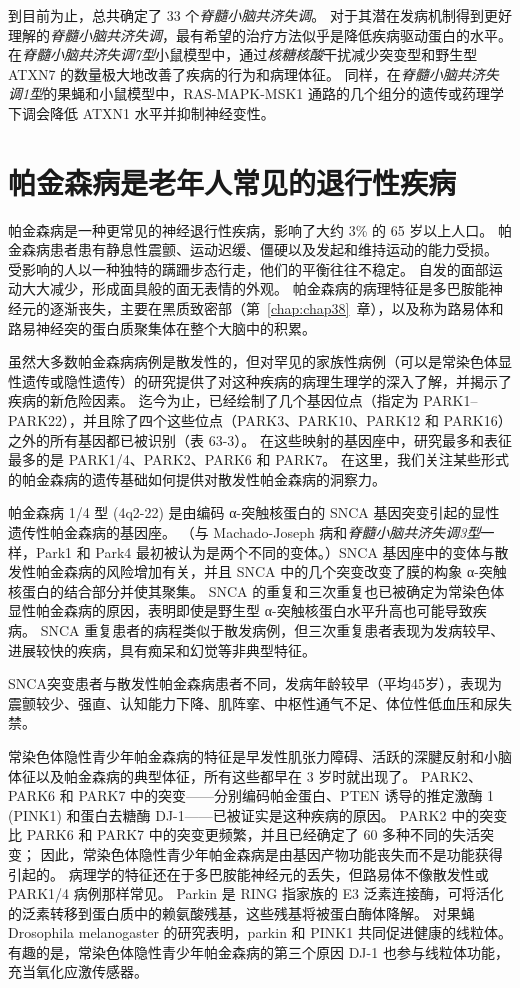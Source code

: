 到目前为止，总共确定了 33 个\textit{脊髓小脑共济失调}。
对于其潜在发病机制得到更好理解的\textit{脊髓小脑共济失调}，最有希望的治疗方法似乎是降低疾病驱动蛋白的水平。
在\textit{脊髓小脑共济失调7型}小鼠模型中，通过\textit{核糖核酸}干扰减少突变型和野生型 ATXN7 的数量极大地改善了疾病的行为和病理体征。
同样，在\textit{脊髓小脑共济失调1型}的果蝇和小鼠模型中，RAS-MAPK-MSK1 通路的几个组分的遗传或药理学下调会降低 ATXN1 水平并抑制神经变性。



\section{帕金森病是老年人常见的退行性疾病}

帕金森病是一种更常见的神经退行性疾病，影响了大约 3\% 的 65 岁以上人口。
帕金森病患者患有静息性震颤、运动迟缓、僵硬以及发起和维持运动的能力受损。
受影响的人以一种独特的蹒跚步态行走，他们的平衡往往不稳定。
自发的面部运动大大减少，形成面具般的面无表情的外观。
帕金森病的病理特征是多巴胺能神经元的逐渐丧失，主要在黑质致密部（第~\ref{chap:chap38}~章），以及称为路易体和路易神经突的蛋白质聚集体在整个大脑中的积累。


虽然大多数帕金森病病例是散发性的，但对罕见的家族性病例（可以是常染色体显性遗传或隐性遗传）的研究提供了对这种疾病的病理生理学的深入了解，并揭示了疾病的新危险因素。
迄今为止，已经绘制了几个基因位点（指定为 PARK1–PARK22），并且除了四个这些位点（PARK3、PARK10、PARK12 和 PARK16）之外的所有基因都已被识别（表 63-3）。
在这些映射的基因座中，研究最多和表征最多的是 PARK1/4、PARK2、PARK6 和 PARK7。
在这里，我们关注某些形式的帕金森病的遗传基础如何提供对散发性帕金森病的洞察力。


帕金森病 1/4 型 (4q2-22) 是由编码 α-突触核蛋白的 SNCA 基因突变引起的显性遗传性帕金森病的基因座。
（与 Machado-Joseph 病和\textit{脊髓小脑共济失调3型}一样，Park1 和 Park4 最初被认为是两个不同的变体。）SNCA 基因座中的变体与散发性帕金森病的风险增加有关，并且 SNCA 中的几个突变改变了膜的构象 α-突触核蛋白的结合部分并使其聚集。
SNCA 的重复和三次重复也已被确定为常染色体显性帕金森病的原因，表明即使是野生型 α-突触核蛋白水平升高也可能导致疾病。
SNCA 重复患者的病程类似于散发病例，但三次重复患者表现为发病较早、进展较快的疾病，具有痴呆和幻觉等非典型特征。


SNCA突变患者与散发性帕金森病患者不同，发病年龄较早（平均45岁），表现为震颤较少、强直、认知能力下降、肌阵挛、中枢性通气不足、体位性低血压和尿失禁。


常染色体隐性青少年帕金森病的特征是早发性肌张力障碍、活跃的深腱反射和小脑体征以及帕金森病的典型体征，所有这些都早在 3 岁时就出现了。
PARK2、PARK6 和 PARK7 中的突变——分别编码帕金蛋白、PTEN 诱导的推定激酶 1 (PINK1) 和蛋白去糖酶 DJ-1——已被证实是这种疾病的原因。
PARK2 中的突变比 PARK6 和 PARK7 中的突变更频繁，并且已经确定了 60 多种不同的失活突变；
因此，常染色体隐性青少年帕金森病是由基因产物功能丧失而不是功能获得引起的。
病理学的特征还在于多巴胺能神经元的丢失，但路易体不像散发性或 PARK1/4 病例那样常见。
Parkin 是 RING 指家族的 E3 泛素连接酶，可将活化的泛素转移到蛋白质中的赖氨酸残基，这些残基将被蛋白酶体降解。
对果蝇 Drosophila melanogaster 的研究表明，parkin 和 PINK1 共同促进健康的线粒体。
有趣的是，常染色体隐性青少年帕金森病的第三个原因 DJ-1 也参与线粒体功能，充当氧化应激传感器。



